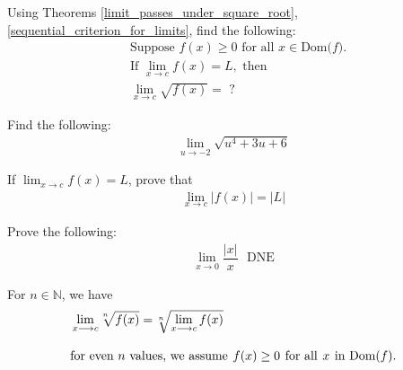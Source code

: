 \begin{exercise}
Using Theorems \ref{limit_passes_under_square_root}, \ref{sequential_criterion_for_limits}, find the following:
\begin{align*}
    &\text{Suppose} \hspace{4pt} f(x) \geq 0 \hspace{4pt} \text{for all} \hspace{4pt} x \in \text{Dom($f$)}.\\[2ex]
    &\text{If} \hspace{4pt} \lim_{x \longrightarrow c} f(x) = L, \hspace{4pt} \text{then}\\[2ex]
    &\lim_{x \longrightarrow c} \sqrt{f(x)} = \hspace{4pt} ?
\end{align*}
\end{exercise}

\begin{exercise}
Find the following:
\begin{align*}
\lim_{u \longrightarrow -2} \sqrt{u^4 + 3u + 6}
\end{align*}
\end{exercise}

\begin{exercise}
If $\lim_{x \longrightarrow c} f(x) = L$, prove that 
\begin{align*}
    \lim_{x \longrightarrow c} \lvert f(x) \rvert = \lvert L \rvert 
\end{align*}
\end{exercise}

\begin{exercise}
Prove the following:
\begin{align*}
    \lim_{x \longrightarrow 0} \dfrac{\lvert x \rvert}{x} \hspace{8pt} \text{DNE}
\end{align*}
\end{exercise}

\begin{theorem}
For $n \in \mathbb{N}$, we have
\begin{align*}
    &\lim_{x \longrightarrow c} \sqrt[\leftroot{2}\uproot{2}n]{f(x)} = \sqrt[\leftroot{2}\uproot{2}n]{\lim_{x \longrightarrow c} f(x)}\\[2ex]
    &\text{for even $n$ values, we assume} \hspace{4pt} f(x) \geq 0 \hspace{4pt} \text{for all} \hspace{4pt} x \hspace{4pt} \text{in Dom($f$)}. 
\end{align*}
\end{theorem}

